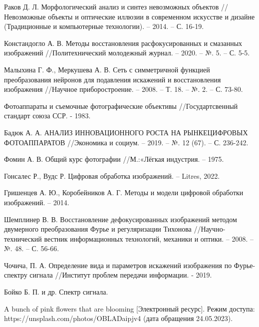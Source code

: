 \renewcommand\bibname{СПИСОК ИСПОЛЬЗОВАННЫХ ИСТОЧНИКОВ}
\begin{thebibliography}{3}
    \makeatletter
    \def\@biblabel#1{#1. }

    Раков Д. Л. Морфологический анализ и синтез невозможных объектов //Невозможные объекты и оптические иллюзии в современном искусстве и дизайне (Традиционные и компьютерные технологии). – 2014. – С. 16-19.
    
    Констандогло А. В. Методы восстановления расфокусированных и смазанных изображений //Политехнический молодежный журнал. – 2020. – №. 5. – С. 5-5.

    Малыхина Г. Ф., Меркушева А. В. Сеть с симметричной функцией преобразования нейронов для подавления искажений и восстановления изображения //Научное приборостроение. – 2008. – Т. 18. – №. 2. – С. 73-80.

    Фотоаппараты и съемочные фотографические объективы //Государтсвенный стандарт союза ССР. - 1983.

    Бадюк А. А. АНАЛИЗ ИННОВАЦИОННОГО РОСТА НА РЫНКЕЦИФРОВЫХ ФОТОАППАРАТОВ //Экономика и социум. – 2019. – №. 12 (67). – С. 236-242.
    
    Фомин А. В. Общий курс фотографии //М.:«Лёгкая индустрия. – 1975.
    
    Гонсалес Р., Вудс Р. Цифровая обработка изображений. – Litres, 2022.
    
    Гришенцев А. Ю., Коробейников А. Г. Методы и модели цифровой обработки изображений. – 2014.
    
    Шемплинер В. В. Восстановление дефокусированных изображений методом двумерного преобразования Фурье и регуляризации Тихонова //Научно-технический вестник информационных технологий, механики и оптики. – 2008. – №. 48. – С. 56-66.

    Чочича, П. А. Определение вида и параметров искажений изображения по Фурье-спектру сигнала //Институт проблем передачи информации. - 2019.

    Бойко Б. П. и др. Спектр сигнала.

    A bunch of pink flowers that are blooming [Электронный ресурс]. Режим доступа: https://unsplash.com/photos/OBLADaipjv4 (дата обращения 24.05.2023).
    

\end{thebibliography}
